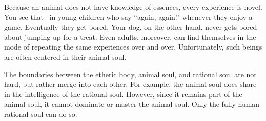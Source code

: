 Because an animal does not have knowledge of essences, every experience is novel. You see that  in young children who say ``again, again!" whenever they enjoy a game. Eventually they get bored. Your dog, on the other hand, never gets bored about jumping up for a treat. Even adults, moreover, can find themselves in the mode of repeating the same experiences over and over. Unfortunately, such beings are often centered in their animal soul.

The boundaries between the etheric body, animal soul, and rational soul are not hard, but rather merge into each other. For example, the animal soul does share in the intelligence of the rational soul. However, since it remains part of the animal soul, it cannot dominate or master the animal soul. Only the fully human rational soul can do so.



